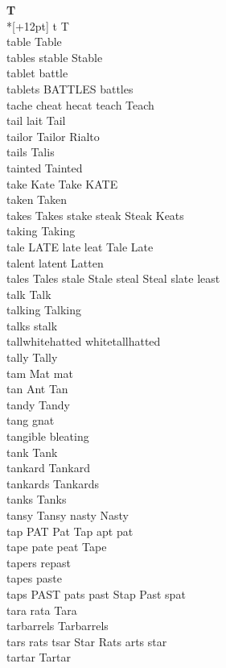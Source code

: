 \vspace{14pt}
\noindent\textbf{\Large T}\\*[+12pt]
t T\\
table Table\\
tables stable Stable\\
tablet battle\\
tablets BATTLES battles\\
tache cheat hecat teach Teach\\
tail lait Tail\\
tailor Tailor Rialto\\
tails Talis\\
tainted Tainted\\
take Kate Take KATE\\
taken Taken\\
takes Takes stake steak Steak Keats\\
taking Taking\\
tale LATE late leat Tale Late\\
talent latent Latten\\
tales Tales stale Stale steal Steal slate least\\
talk Talk\\
talking Talking\\
talks stalk\\
tallwhitehatted whitetallhatted\\
tally Tally\\
tam Mat mat\\
tan Ant Tan\\
tandy Tandy\\
tang gnat\\
tangible bleating\\
tank Tank\\
tankard Tankard\\
tankards Tankards\\
tanks Tanks\\
tansy Tansy nasty Nasty\\
tap PAT Pat Tap apt pat\\
tape pate peat Tape\\
tapers repast\\
tapes paste\\
taps PAST pats past Stap Past spat\\
tara rata Tara\\
tarbarrels Tarbarrels\\
tars rats tsar Star Rats arts star\\
tartar Tartar\\
